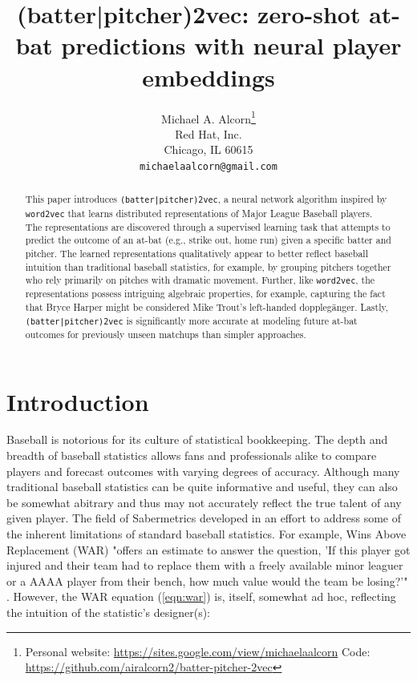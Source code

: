 \documentclass{article}
\title{(batter|pitcher)2vec: zero-shot at-bat predictions with neural player embeddings}
\date{}
\author{
    Michael A. Alcorn\thanks
    {Personal website: \url{https://sites.google.com/view/michaelaalcorn}\newline
    \hspace*{1.8em}Code: \url{https://github.com/airalcorn2/batter-pitcher-2vec}} \\
    Red Hat, Inc.\\
    Chicago, IL 60615 \\
    \texttt{michaelaalcorn@gmail.com} \\
}
\begin{document}
\maketitle

\begin{abstract}

This paper introduces \texttt{(batter|pitcher)2vec}, a neural network algorithm inspired by \texttt{word2vec} that learns distributed representations of Major League Baseball players. The representations are discovered through a supervised learning task that attempts to predict the outcome of an at-bat (e.g., strike out, home run) given a specific batter and pitcher. The learned representations qualitatively appear to better reflect baseball intuition than traditional baseball statistics, for example, by grouping pitchers together who rely primarily on pitches with dramatic movement. Further, like \texttt{word2vec}, the representations possess intriguing algebraic properties, for example, capturing the fact that Bryce Harper might be considered Mike Trout's left-handed dopplegänger. Lastly, \texttt{(batter|pitcher)2vec} is significantly more accurate at modeling future at-bat outcomes for previously unseen matchups than simpler approaches.

\end{abstract}

\section{Introduction}

Baseball is notorious for its culture of statistical bookkeeping. The depth and breadth of baseball statistics allows fans and professionals alike to compare players and forecast outcomes with varying degrees of accuracy. Although many traditional baseball statistics can be quite informative and useful, they can also be somewhat abitrary and thus may not accurately reflect the true talent of any given player. The field of Sabermetrics developed in an effort to address some of the inherent limitations of standard baseball statistics. For example, Wins Above Replacement (WAR) "offers an estimate to answer the question, 'If this player got injured and their team had to replace them with a freely available minor leaguer or a AAAA player from their bench, how much value would the team be losing?'" \parencite{WAR}. However, the WAR equation (\ref{eqn:war}) is, itself, somewhat ad hoc, reflecting the intuition of the statistic's designer(s):
\end{document}
